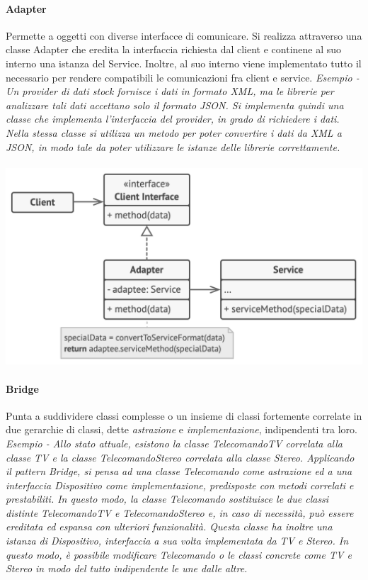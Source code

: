\documentclass{article}
\begin{document}
            \paragraph{Adapter} Permette a oggetti con diverse interfacce di comunicare.
                Si realizza attraverso una classe Adapter che eredita la interfaccia richiesta dal client e continene al suo interno una istanza del Service.
                Inoltre, al suo interno viene implementato tutto il necessario per rendere compatibili le comunicazioni fra client e service.
                \textit{Esempio - Un provider di dati stock fornisce i dati in formato XML, ma le librerie per analizzare tali dati accettano solo il formato JSON.
                    Si implementa quindi una classe che implementa l'interfaccia del provider, in grado di richiedere i dati.
                    Nella stessa classe si utilizza un metodo per poter convertire i dati da XML a JSON, in modo tale da poter utilizzare le istanze delle librerie correttamente.
                }
            \paragraph{}\includegraphics[scale=0.25]{./img/adapter.png}

            \paragraph{Bridge} Punta a suddividere classi complesse o un insieme di classi fortemente correlate in due gerarchie di classi, dette \textit{astrazione} e \textit{implementazione}, indipendenti tra loro.\\
                \textit{Esempio - Allo stato attuale, esistono la classe TelecomandoTV correlata alla classe TV e la classe TelecomandoStereo correlata alla classe Stereo.
                    Applicando il pattern Bridge, si pensa ad una classe Telecomando come \textit{astrazione} ed a una interfaccia Dispositivo come \textit{implementazione}, predisposte con metodi correlati e prestabiliti.
                    In questo modo, la classe Telecomando sostituisce le due classi distinte TelecomandoTV e TelecomandoStereo e, in caso di necessità, può essere ereditata ed espansa con ulteriori funzionalità.
                    Questa classe ha inoltre una istanza di Dispositivo, interfaccia a sua volta implementata da TV e Stereo.
                    In questo modo, è possibile modificare Telecomando o le classi concrete come TV e Stereo in modo del tutto indipendente le une dalle altre.
                }
\end{document}
